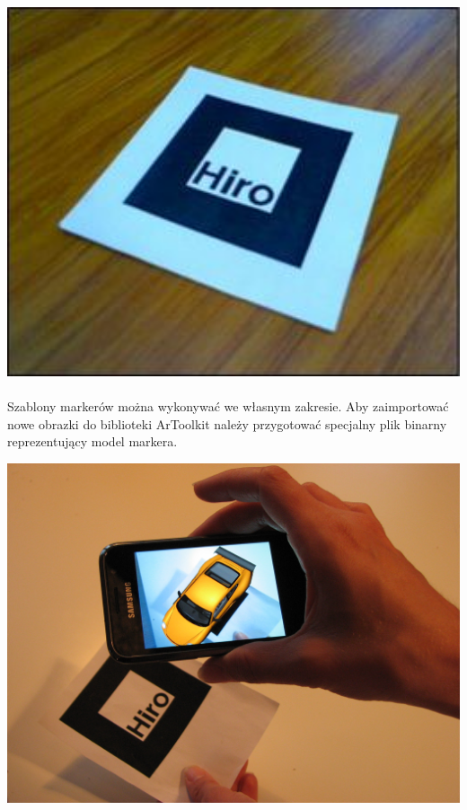 \begin{center}
\includegraphics[width=1\textwidth]{images/hiro.png}

\end{center}
\paragraph{}
Szablony markerów można wykonywać we własnym zakresie. Aby zaimportować nowe obrazki do biblioteki ArToolkit należy przygotować specjalny plik binarny reprezentujący model markera\cite{marker}.

\begin{center}
\includegraphics[width=1\textwidth]{images/artoolkit-demo.jpg}
\end{center}
